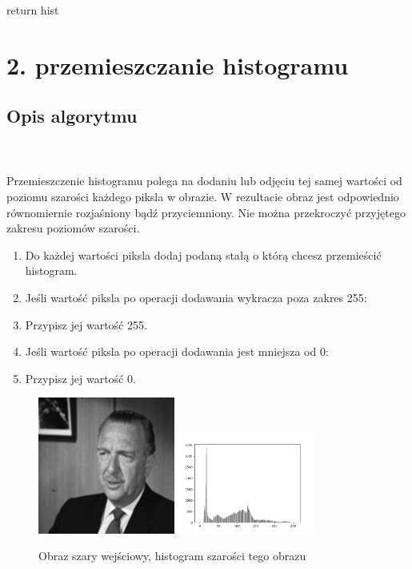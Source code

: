 \documentclass[final,a4paper,openany,12pt]{mwbk}
\begin{document}
return hist \newline
\newpage





\section*{2. przemieszczanie histogramu}
\subsection*{Opis algorytmu}
\hfill
\\\\
\indent Przemieszczenie histogramu polega na dodaniu lub odjęciu tej samej wartości od poziomu szarości każdego piksla w obrazie.
W rezultacie obraz jest odpowiednio równomiernie rozjaśniony bądź przyciemniony.
Nie można przekroczyć przyjętego zakresu poziomów szarości.
\begin{enumerate}
	\item Do każdej wartości piksla dodaj podaną stałą o którą chcesz przemieścić histogram.
	\item Jeśli wartość piksla po operacji dodawania wykracza poza zakres 255:
	\item Przypisz jej wartość 255.
	\item Jeśli wartość piksla po operacji dodawania jest mniejsza od 0:
	\item Przypisz jej wartość 0.
\end{enumerate}

\begin{figure}[H]
	\begin{center}
		\includegraphics[width=0.4\textwidth]{gentelman_gray}
		\includegraphics[width=0.4\textwidth]{gentelman_gray_histogram}
	\end{center}
	\caption{Obraz szary wejściowy, histogram szarości tego obrazu}
\end{figure}
\end{document}
